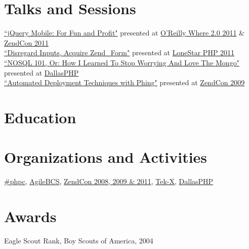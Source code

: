 \documentclass{resume}
\begin{document}

\section{Talks and Sessions}

\href{http://www.slideshare.net/eljefe/jquery-mobile-for-fun-and-profit}{``jQuery Mobile: For Fun and Profit"} presented at \href{http://whereconf.com/where2011}{O'Reilly Where 2.0 2011} \& \href{http://zendcon.com/}{ZendCon 2011}
\\
\href{http://www.slideshare.net/eljefe/disregard-inputs-acquire-zendform}{``Disregard Inputs, Acquire Zend_Form"} presented at \href{http://lonestarphp.com/}{LoneStar PHP 2011}
\\
\href{http://www.slideshare.net/eljefe/automated-deployment-with-phing}{``NOSQL 101, Or: How I Learned To Stop Worrying And Love The Mongo"} presented at \href{http://http://dallasphp.org/}{DallasPHP}
\\
\href{http://www.slideshare.net/eljefe/automated-deployment-with-phing}{``Automated Deployment Techniques with Phing"} presented at \href{http://zendcon.com/2009/speakers#4054}{ZendCon 2009}

\section{Education}


\section{Organizations and Activities}

\href{http://www.phpcommunity.org/}{\#phpc},
\href{http://agilebcs.org/}{AgileBCS},
\href{http://www.zendcon.com/}{ZendCon 2008, 2009 \& 2011},
\href{http://tek.phparch.com/}{Tek-X},
\href{http://http://dallasphp.org/}{DallasPHP}

\section{Awards}

Eagle Scout Rank, Boy Scouts of America, 2004
\end{document}
